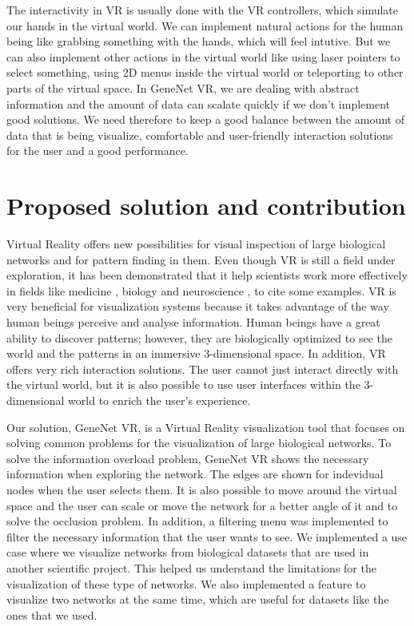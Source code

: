The interactivity in VR is usually done with the VR controllers, which simulate our hands in the virtual world. We can implement natural actions for the human being like grabbing something with the hands, which will feel intutive. But we can also implement other actions in the virtual world like using laser pointers to select something, using 2D menus inside the virtual world or teleporting to other parts of the virtual space. In GeneNet VR, we are dealing with abstract information and the amount of data can scalate quickly if we don't implement good solutions. We need therefore to keep a good balance between the amount of data that is being visualize, comfortable and user-friendly interaction solutions for the user and a good performance.

\section{Proposed solution and contribution}

Virtual Reality offers new possibilities for visual inspection of large biological networks and for pattern finding in them. Even though VR is still a field under exploration, it has been demonstrated that it help scientists work more effectively in fields like medicine \cite{Laver11} \cite{xia_ip_samman_wong_gateno_wang_yeung_kot_tideman_2001} \cite{brain_damage_rehab}, biology \cite{bioinformatics_bti581} \cite{thorley_lawson_duca_shapiro_2008} and neuroscience \cite{bohil_alicea_biocca_2011}\cite{minderer_harvey_donato_moser_2016}, to  cite some examples.
VR is very beneficial for visualization systems because it takes advantage of the way human beings perceive and analyse information. Human beings have a great ability to discover patterns; however, they are biologically optimized to see the world and the patterns in an immersive 3-dimensional space. In addition, VR offers very rich interaction solutions. The user cannot just interact directly with the virtual world, but it is also possible to use user interfaces within the 3-dimensional world to enrich the user's experience.

Our solution, GeneNet VR, is a Virtual Reality visualization tool that focuses on solving common problems for the visualization of large biological networks. To solve the information overload problem, GeneNet VR shows the necessary information when exploring the network. The edges are shown for indevidual nodes when the user selects them. It is also possible to move around the virtual space and the user can scale or move the network for a better angle of it and to solve the occlusion problem. In addition, a filtering menu was implemented to filter the necessary information that the user wants to see. We implemented a use case where we visualize networks from biological datasets that are used in another scientific project. This helped us understand the limitations for the visualization of these type of networks. We also implemented a feature to visualize two networks at the same time, which are useful for datasets like the ones that we used.

